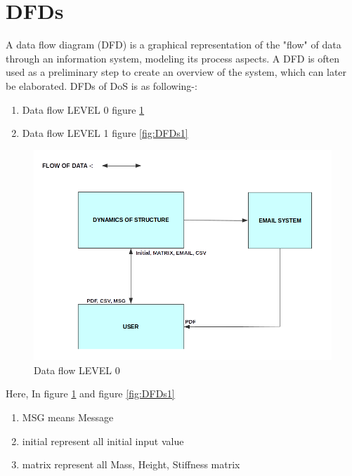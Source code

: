 \section{DFDs}
A data flow diagram (DFD) is a graphical representation of the "flow" of data through an information system, modeling its process aspects. A DFD is often used as a preliminary step to create an overview of the system, which can later be elaborated. DFDs of DoS is as following-:
\begin{enumerate}
\item Data flow LEVEL 0 figure \ref{fig:DFDs}
\item Data flow LEVEL 1 figure \ref{fig:DFDs1}
\end{enumerate}

\begin{figure}[H]
\centering \includegraphics[scale=0.4]{images/DFDS.png}
\caption{Data flow LEVEL 0}
\label{fig:DFDs}
\end{figure}
Here, In figure \ref{fig:DFDs} and figure \ref{fig:DFDs1}
\begin{enumerate}
\item MSG means Message
\item initial represent all initial input value
\item matrix represent all Mass, Height, Stiffness matrix
\end{enumerate}

